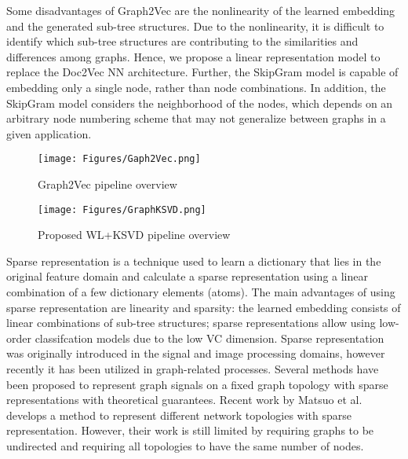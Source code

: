 Some disadvantages of Graph2Vec are the nonlinearity of the learned embedding and the generated sub-tree structures. Due to the nonlinearity, it is difficult to identify which sub-tree structures are contributing to the similarities and differences among graphs. Hence, we propose a linear representation model to replace the Doc2Vec NN architecture. Further, the SkipGram model is capable of embedding only a single node, rather than node combinations. In addition, the SkipGram model considers the neighborhood of the nodes, which depends on an arbitrary node numbering scheme that may not generalize between graphs in a given application.

\begin{figure}[!t]
\centerline{\texttt{[image: Figures/Gaph2Vec.png]}}
\caption{Graph2Vec pipeline overview}\label{fig: G2V}
\end{figure}

\begin{figure}[!t]
\centerline{\texttt{[image: Figures/GraphKSVD.png]}}
\caption{Proposed WL+KSVD pipeline overview}\label{fig: GKSVD}
\end{figure}

Sparse representation is a technique used to learn a dictionary that lies in the original feature domain and calculate a sparse representation using a linear combination of a few dictionary elements (atoms)\cite{Elad2010}. %
The main advantages of using sparse representation are linearity and sparsity: the learned embedding consists of linear combinations of sub-tree structures; sparse representations allow using low-order classifcation models due to the low VC dimension\cite{Neylon2006}. Sparse representation was originally introduced in the signal and image processing domains, however recently it has been utilized in graph-related processes. Several methods have been proposed to represent graph signals on a fixed graph topology with sparse representations with theoretical guarantees\cite{Yankelevsky2019}. %
Recent work by Matsuo et al.\cite{Matsuo2019} develops a method to represent different network topologies with sparse representation. However, their work is still limited by requiring graphs to be undirected and requiring all topologies to have the same number of nodes.

